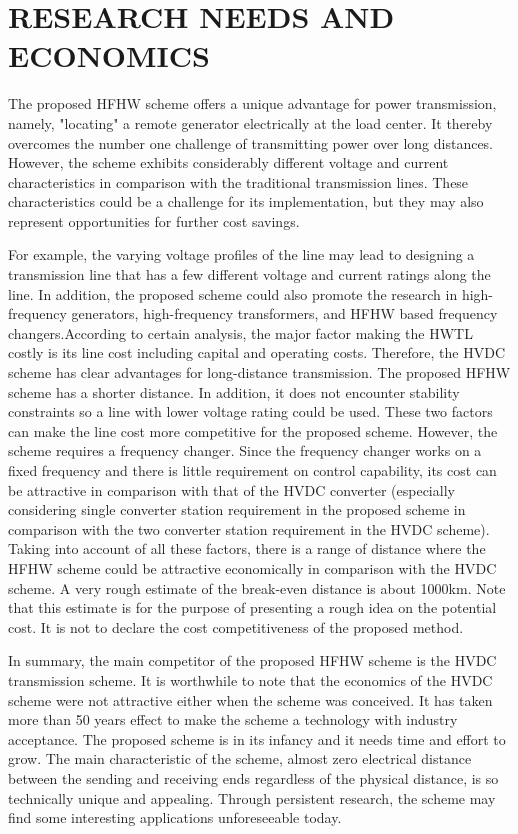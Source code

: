 \documentclass[12pt,a4paper]{reportmod}
\begin{document}
\chapter{RESEARCH NEEDS AND ECONOMICS}
\par The proposed HFHW scheme offers a unique advantage for power transmission, namely, "locating" a remote generator electrically at the load center. It thereby overcomes the number one challenge of transmitting power over long distances. However, the scheme exhibits considerably different voltage and current characteristics in comparison with the traditional transmission lines. These characteristics could be a challenge for its implementation, but they may also represent opportunities for further cost savings.
\par For example, the varying voltage profiles of the line may lead to designing a transmission line that has a few different voltage and current ratings along the line. In addition, the proposed scheme could also promote the research in high-frequency generators, high-frequency transformers, and HFHW based frequency changers.According to certain analysis, the major factor making the HWTL costly is its line cost including capital and operating costs. Therefore, the HVDC scheme has clear advantages for long-distance transmission. The proposed HFHW scheme has a shorter distance. In addition, it does not encounter stability constraints so a line with lower voltage rating could be used. These two factors can make the line cost more competitive for the proposed scheme. However, the scheme requires a frequency changer. Since the frequency changer works on a fixed frequency and there is little requirement on control capability, its cost can be attractive in comparison with that of the HVDC converter (especially considering single converter station requirement in the proposed scheme in comparison with the two converter station requirement in the HVDC scheme). Taking into account of all these factors, there is a range of distance where the HFHW scheme could be attractive economically in comparison with the HVDC scheme. A very rough estimate of the break-even distance is about 1000km. Note that this estimate is for the purpose of presenting a rough idea on the potential cost. It is not to declare the cost competitiveness of the proposed method.
\par In summary, the main competitor of the proposed HFHW scheme is the HVDC transmission scheme. It is worthwhile to note that the economics of the HVDC scheme were not attractive either when the scheme was conceived. It has taken more than 50 years effect to make the scheme a technology with industry acceptance. The proposed scheme is in its infancy and it needs time and effort to grow. The main characteristic of the scheme, almost zero electrical distance between the sending and receiving ends regardless of the physical distance, is so technically unique and appealing. Through persistent research, the scheme may find some interesting applications unforeseeable today.
\end{document}
